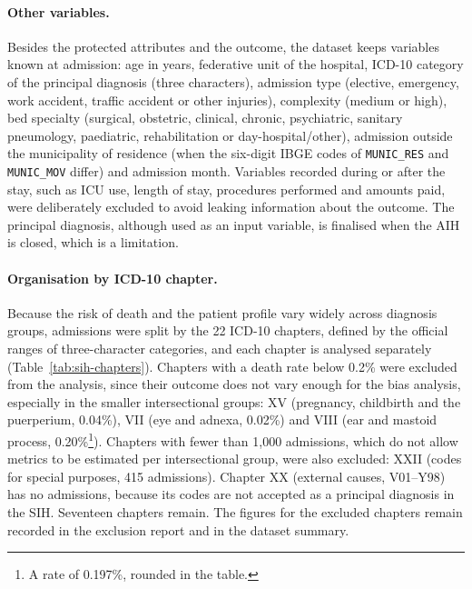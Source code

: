 \paragraph{Other variables.}
Besides the protected attributes and the outcome, the dataset keeps variables
known at admission: age in years, federative unit of the hospital, ICD-10
category of the principal diagnosis (three characters), admission type
(elective, emergency, work accident, traffic accident or other injuries),
complexity (medium or high), bed specialty (surgical, obstetric, clinical,
chronic, psychiatric, sanitary pneumology, paediatric, rehabilitation or
day-hospital/other), admission outside the municipality of residence (when the
six-digit IBGE codes of \texttt{MUNIC\_RES} and \texttt{MUNIC\_MOV} differ) and
admission month. Variables recorded during or after the stay, such as ICU use,
length of stay, procedures performed and amounts paid, were deliberately
excluded to avoid leaking information about the outcome. The principal
diagnosis, although used as an input variable, is finalised when the AIH is
closed, which is a limitation.

\paragraph{Organisation by ICD-10 chapter.}
Because the risk of death and the patient profile vary widely across diagnosis
groups, admissions were split by the 22 ICD-10 chapters, defined by the
official ranges of three-character categories, and each chapter is analysed
separately (Table~\ref{tab:sih-chapters}). Chapters with a death rate below
0.2\% were excluded from the analysis, since their outcome does not vary enough
for the bias analysis, especially in the smaller intersectional groups: XV
(pregnancy, childbirth and the puerperium, 0.04\%), VII (eye and adnexa,
0.02\%) and VIII (ear and mastoid process, 0.20\%\footnote{A rate of 0.197\%,
rounded in the table.}). Chapters with fewer than 1,000 admissions, which do
not allow metrics to be estimated per intersectional group, were also
excluded: XXII (codes for special purposes, 415 admissions). Chapter XX
(external causes, V01--Y98) has no admissions, because its codes are not
accepted as a principal diagnosis in the SIH. Seventeen chapters remain. The
figures for the excluded chapters remain recorded in the exclusion report and
in the dataset summary.

